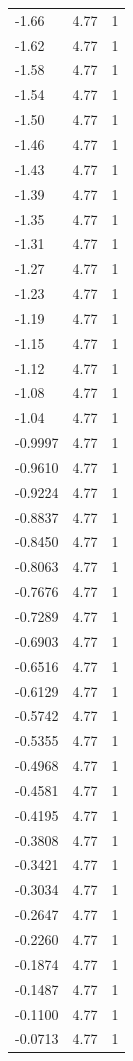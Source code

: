 \begin{longtable}{lrr}
  -1.66 & 4.77 & 1 \\
  -1.62 & 4.77 & 1 \\
  -1.58 & 4.77 & 1 \\
  -1.54 & 4.77 & 1 \\
  -1.50 & 4.77 & 1 \\
  -1.46 & 4.77 & 1 \\
  -1.43 & 4.77 & 1 \\
  -1.39 & 4.77 & 1 \\
  -1.35 & 4.77 & 1 \\
  -1.31 & 4.77 & 1 \\
  -1.27 & 4.77 & 1 \\
  -1.23 & 4.77 & 1 \\
  -1.19 & 4.77 & 1 \\
  -1.15 & 4.77 & 1 \\
  -1.12 & 4.77 & 1 \\
  -1.08 & 4.77 & 1 \\
  -1.04 & 4.77 & 1 \\
  -0.9997 & 4.77 & 1 \\
  -0.9610 & 4.77 & 1 \\
  -0.9224 & 4.77 & 1 \\
  -0.8837 & 4.77 & 1 \\
  -0.8450 & 4.77 & 1 \\
  -0.8063 & 4.77 & 1 \\
  -0.7676 & 4.77 & 1 \\
  -0.7289 & 4.77 & 1 \\
  -0.6903 & 4.77 & 1 \\
  -0.6516 & 4.77 & 1 \\
  -0.6129 & 4.77 & 1 \\
  -0.5742 & 4.77 & 1 \\
  -0.5355 & 4.77 & 1 \\
  -0.4968 & 4.77 & 1 \\
  -0.4581 & 4.77 & 1 \\
  -0.4195 & 4.77 & 1 \\
  -0.3808 & 4.77 & 1 \\
  -0.3421 & 4.77 & 1 \\
  -0.3034 & 4.77 & 1 \\
  -0.2647 & 4.77 & 1 \\
  -0.2260 & 4.77 & 1 \\
  -0.1874 & 4.77 & 1 \\
  -0.1487 & 4.77 & 1 \\
  -0.1100 & 4.77 & 1 \\
  -0.0713 & 4.77 & 1 \\

\end{longtable}
